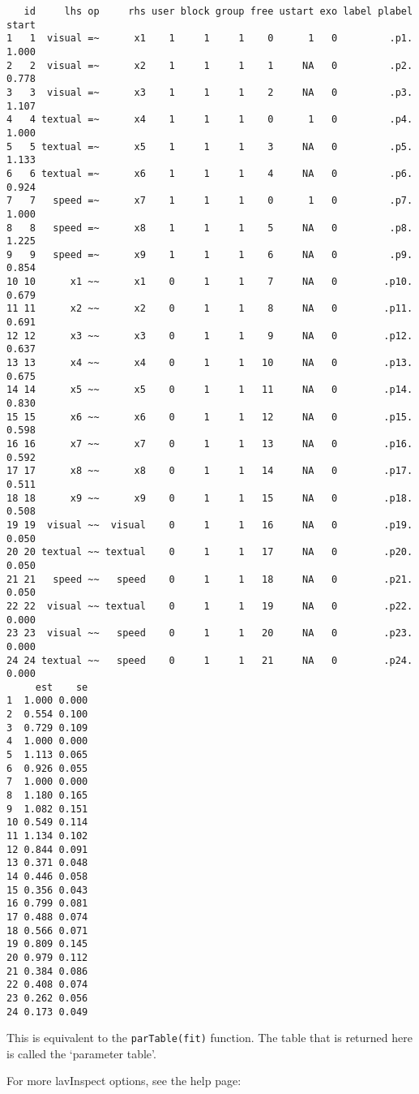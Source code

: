 \begin{Shaded}
\begin{Highlighting}[]
 \NormalTok{)}
\end{Highlighting}
\end{Shaded}

\begin{verbatim}
   id     lhs op     rhs user block group free ustart exo label plabel start
1   1  visual =~      x1    1     1     1    0      1   0         .p1. 1.000
2   2  visual =~      x2    1     1     1    1     NA   0         .p2. 0.778
3   3  visual =~      x3    1     1     1    2     NA   0         .p3. 1.107
4   4 textual =~      x4    1     1     1    0      1   0         .p4. 1.000
5   5 textual =~      x5    1     1     1    3     NA   0         .p5. 1.133
6   6 textual =~      x6    1     1     1    4     NA   0         .p6. 0.924
7   7   speed =~      x7    1     1     1    0      1   0         .p7. 1.000
8   8   speed =~      x8    1     1     1    5     NA   0         .p8. 1.225
9   9   speed =~      x9    1     1     1    6     NA   0         .p9. 0.854
10 10      x1 ~~      x1    0     1     1    7     NA   0        .p10. 0.679
11 11      x2 ~~      x2    0     1     1    8     NA   0        .p11. 0.691
12 12      x3 ~~      x3    0     1     1    9     NA   0        .p12. 0.637
13 13      x4 ~~      x4    0     1     1   10     NA   0        .p13. 0.675
14 14      x5 ~~      x5    0     1     1   11     NA   0        .p14. 0.830
15 15      x6 ~~      x6    0     1     1   12     NA   0        .p15. 0.598
16 16      x7 ~~      x7    0     1     1   13     NA   0        .p16. 0.592
17 17      x8 ~~      x8    0     1     1   14     NA   0        .p17. 0.511
18 18      x9 ~~      x9    0     1     1   15     NA   0        .p18. 0.508
19 19  visual ~~  visual    0     1     1   16     NA   0        .p19. 0.050
20 20 textual ~~ textual    0     1     1   17     NA   0        .p20. 0.050
21 21   speed ~~   speed    0     1     1   18     NA   0        .p21. 0.050
22 22  visual ~~ textual    0     1     1   19     NA   0        .p22. 0.000
23 23  visual ~~   speed    0     1     1   20     NA   0        .p23. 0.000
24 24 textual ~~   speed    0     1     1   21     NA   0        .p24. 0.000
     est    se
1  1.000 0.000
2  0.554 0.100
3  0.729 0.109
4  1.000 0.000
5  1.113 0.065
6  0.926 0.055
7  1.000 0.000
8  1.180 0.165
9  1.082 0.151
10 0.549 0.114
11 1.134 0.102
12 0.844 0.091
13 0.371 0.048
14 0.446 0.058
15 0.356 0.043
16 0.799 0.081
17 0.488 0.074
18 0.566 0.071
19 0.809 0.145
20 0.979 0.112
21 0.384 0.086
22 0.408 0.074
23 0.262 0.056
24 0.173 0.049
\end{verbatim}

This is equivalent to the \texttt{parTable(fit)} function. The table
that is returned here is called the `parameter table'.

For more lavInspect options, see the help page:

\begin{Shaded}
\begin{Highlighting}[]
\end{Highlighting}
\end{Shaded}
